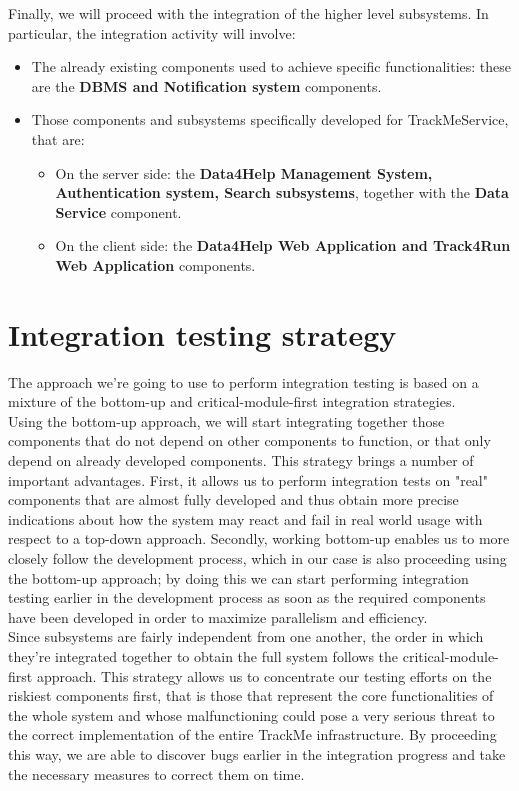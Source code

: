 \documentclass[a4paper, hidelinks, 12pt]{report}
\begin{document}
		Finally, we will proceed with the integration of the higher level subsystems. In particular, the integration activity will involve:
	\begin{itemize}
	\item{} The already existing components used to achieve
specific functionalities: these are the \textbf{DBMS and Notification system} components.
\item{} Those components and subsystems specifically developed for TrackMeService, that are:

	\begin{itemize}
	\item{} On the server side: the \textbf{Data4Help Management System, Authentication system, Search subsystems}, together with the \textbf{Data Service} component.
	\item{} On the client side: the \textbf{Data4Help Web Application and Track4Run Web Application} components.
	\end{itemize}

	\end{itemize}

	\section{Integration testing strategy}
	The approach we're going to use to perform integration testing is based on a mixture of the bottom-up and critical-module-first integration strategies.\\

	Using the bottom-up approach, we will start integrating together those components that do not depend on other components to function, or that only depend on already developed components. This strategy brings a number of important advantages. First, it allows us to perform integration tests on "real" components that are almost fully developed and thus obtain more precise indications about how the system may react and fail in real world usage with respect to a top-down approach. Secondly, working bottom-up enables us to more closely follow the development process, which in our case is also proceeding using the bottom-up approach; by doing this we can start performing integration testing earlier in the development process as soon as the required components have been developed in order to maximize parallelism and efficiency.\\

	Since subsystems are fairly independent from one another, the order in which they're integrated together to obtain the full system follows the critical-module-first approach. This strategy allows us to concentrate our testing efforts on the riskiest components first, that is those that represent the core functionalities of the whole system and whose malfunctioning could pose a very serious threat to the correct implementation of the entire TrackMe infrastructure. By proceeding this way, we are able to discover bugs earlier in the integration progress and take the necessary measures to correct them on time.
\end{document}
